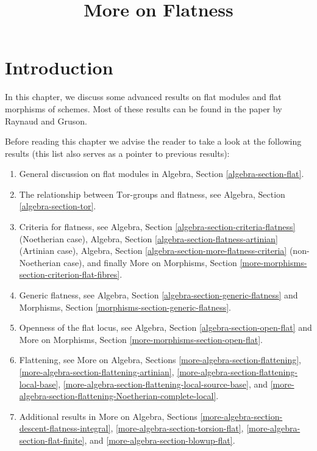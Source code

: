 

%


\title{More on Flatness}

\maketitle

\label{section-phantom}

\tableofcontents



\section{Introduction}
\label{section-introduction}

\noindent
In this chapter, we discuss some advanced results on flat modules and
flat morphisms of schemes. Most of these results can be
found in the paper \cite{GruRay} by Raynaud and Gruson.

\medskip\noindent
Before reading this chapter we advise the reader to take a look
at the following results (this list also serves as a pointer to
previous results):
\begin{enumerate}
\item General discussion on flat modules in
Algebra, Section \ref{algebra-section-flat}.
\item The relationship between $\text{Tor}$-groups and flatness, see
Algebra, Section \ref{algebra-section-tor}.
\item Criteria for flatness, see
Algebra, Section \ref{algebra-section-criteria-flatness}
(Noetherian case),
Algebra, Section \ref{algebra-section-flatness-artinian}
(Artinian case),
Algebra, Section \ref{algebra-section-more-flatness-criteria}
(non-Noetherian case), and finally
More on Morphisms, Section \ref{more-morphisms-section-criterion-flat-fibres}.
\item Generic flatness, see
Algebra, Section \ref{algebra-section-generic-flatness}
and
Morphisms, Section \ref{morphisms-section-generic-flatness}.
\item Openness of the flat locus, see
Algebra, Section \ref{algebra-section-open-flat}
and
More on Morphisms, Section \ref{more-morphisms-section-open-flat}.
\item Flattening, see
More on Algebra, Sections
\ref{more-algebra-section-flattening},
\ref{more-algebra-section-flattening-artinian},
\ref{more-algebra-section-flattening-local-base},
\ref{more-algebra-section-flattening-local-source-base}, and
\ref{more-algebra-section-flattening-Noetherian-complete-local}.
\item Additional results in
More on Algebra, Sections \ref{more-algebra-section-descent-flatness-integral},
\ref{more-algebra-section-torsion-flat},
\ref{more-algebra-section-flat-finite}, and
\ref{more-algebra-section-blowup-flat}.
\end{enumerate}




